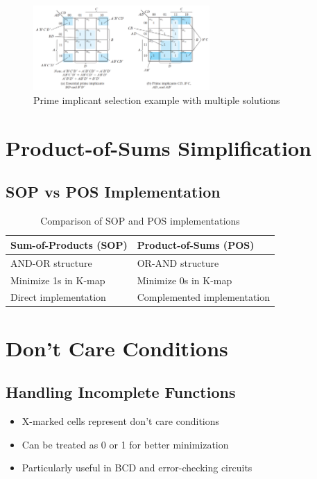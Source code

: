 \documentclass[11pt]{article}
\begin{document}
\begin{figure}[htbp]
\centering
\includegraphics[width=0.6\textwidth]{figs/pr.png}
\caption{Prime implicant selection example with multiple solutions}
\label{fig:prime}
\end{figure}

\section{Product-of-Sums Simplification}
\subsection{SOP vs POS Implementation}
\begin{table}[htbp]
\centering
\begin{tabular}{p{}p{}}
\toprule
\textbf{Sum-of-Products (SOP)} & \textbf{Product-of-Sums (POS)} \\
\midrule
AND-OR structure & OR-AND structure \\
Minimize 1s in K-map & Minimize 0s in K-map \\
Direct implementation & Complemented implementation \\
\bottomrule
\end{tabular}
\caption{Comparison of SOP and POS implementations}
\end{table}

\section{Don't Care Conditions}
\subsection{Handling Incomplete Functions}
\begin{itemize}
\item X-marked cells represent don't care conditions
\item Can be treated as 0 or 1 for better minimization
\item Particularly useful in BCD and error-checking circuits
\end{itemize}
\end{document}
